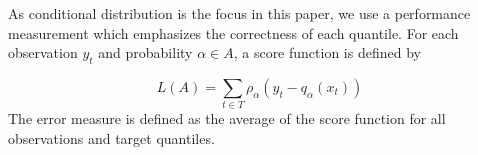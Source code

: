 As conditional distribution is the focus in this paper, we use a performance measurement which emphasizes the correctness of each quantile. 
For each observation $y_t$ and probability $\alpha \in A$, a score function
is defined by

\[
L(A)= \sum_{t\in T}\rho_{\alpha}(y_{t}-q_{\alpha}(x_t))
\]
The error measure is defined as the average of the score function
for all observations and target quantiles.











